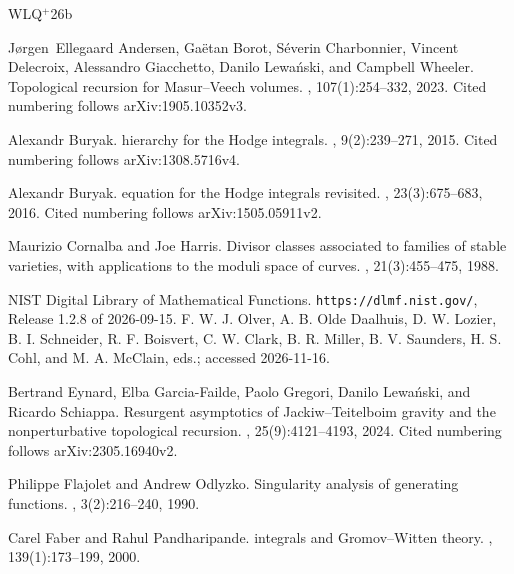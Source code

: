 \documentclass[a4paper,10pt]{article}
\numberwithin{equation}{section}
\theoremstyle{paperplain}
\theoremstyle{paperremark}
\theoremstyle{paperplain}
\begin{document}
\newcommand{\etalchar}[1]{$^{#1}$}
\begin{thebibliography}{WLQ{\etalchar{+}}26b}

\bibitem[ABC{\etalchar{+}}23]{ABCDGLW23}
J{\o}rgen~Ellegaard Andersen, Ga{\"e}tan Borot, S{\'e}verin Charbonnier,
  Vincent Delecroix, Alessandro Giacchetto, Danilo Lewa{\'n}ski, and Campbell
  Wheeler.
\newblock Topological recursion for {Masur--Veech} volumes.
, 107(1):254--332,
  2023.
\newblock Cited numbering follows arXiv:1905.10352v3.

Alexandr Buryak.
 hierarchy for the {Hodge} integrals.
, 9(2):239--271,
  2015.
\newblock Cited numbering follows arXiv:1308.5716v4.

Alexandr Buryak.
 equation for the {Hodge} integrals revisited.
, 23(3):675--683, 2016.
\newblock Cited numbering follows arXiv:1505.05911v2.

Maurizio Cornalba and Joe Harris.
\newblock Divisor classes associated to families of stable varieties, with
  applications to the moduli space of curves.
,
  21(3):455--475, 1988.

{NIST Digital Library of Mathematical Functions}.
\newblock \texttt{https://dlmf.nist.gov/}, Release 1.2.8 of 2026-09-15.
\newblock F. W. J. Olver, A. B. Olde Daalhuis, D. W. Lozier, B. I. Schneider,
  R. F. Boisvert, C. W. Clark, B. R. Miller, B. V. Saunders, H. S. Cohl, and M.
  A. McClain, eds.; accessed 2026-11-16.

\bibitem[EGFG{\etalchar{+}}24]{EGGLS24}
Bertrand Eynard, Elba Garcia-Failde, Paolo Gregori, Danilo Lewa{\'n}ski, and
  Ricardo Schiappa.
\newblock Resurgent asymptotics of {Jackiw--Teitelboim} gravity and the
  nonperturbative topological recursion.
, 25(9):4121--4193, 2024.
\newblock Cited numbering follows arXiv:2305.16940v2.

Philippe Flajolet and Andrew Odlyzko.
\newblock Singularity analysis of generating functions.
, 3(2):216--240, 1990.

Carel Faber and Rahul Pandharipande.
 integrals and {Gromov--Witten} theory.
, 139(1):173--199, 2000.


\end{thebibliography}
\end{document}
